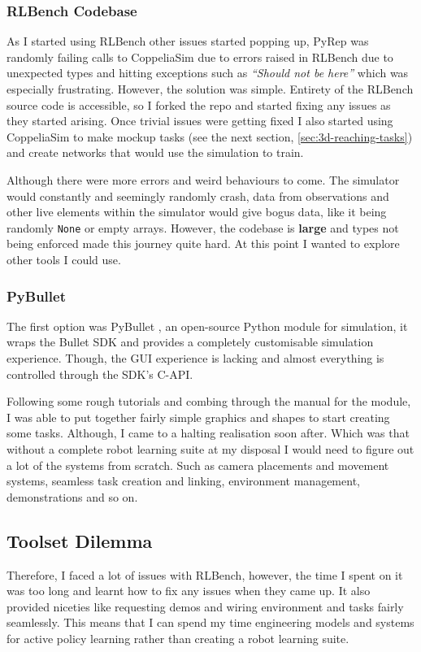 \subsubsection{RLBench Codebase}
As I started using RLBench other issues started popping up, PyRep was randomly failing calls to CoppeliaSim due to errors raised in RLBench due to unexpected types and hitting exceptions such as \emph{``Should not be here''} which was especially frustrating. However, the solution was simple. Entirety of the RLBench source code is accessible, so I forked the repo and started fixing any issues as they started arising. Once trivial issues were getting fixed I also started using CoppeliaSim to make mockup tasks (see the next section, \ref{sec:3d-reaching-tasks}) and create networks that would use the simulation to train.

Although there were more errors and weird behaviours to come. The simulator would constantly and seemingly randomly crash, data from observations and other live elements within the simulator would give bogus data, like it being randomly \verb|None| or empty arrays. However, the codebase is \textbf{large} and types not being enforced made this journey quite hard. At this point I wanted to explore other tools I could use.

\subsubsection{PyBullet}
The first option was PyBullet \cite{pybullet}, an open-source Python module for simulation, it wraps the Bullet SDK \cite{bullet3} and provides a completely customisable simulation experience. Though, the GUI experience is lacking and almost everything is controlled through the SDK's C-API.

Following some rough tutorials and combing through the manual for the module, I was able to put together fairly simple graphics and shapes to start creating some tasks. Although, I came to a halting realisation soon after. Which was that without a complete robot learning suite at my disposal I would need to figure out a lot of the systems from scratch. Such as camera placements and movement systems, seamless task creation and linking, environment management, demonstrations and so on.


\subsection{Toolset Dilemma}
Therefore, I faced a lot of issues with RLBench, however, the time I spent on it was too long and learnt how to fix any issues when they came up. It also provided niceties like requesting demos and wiring environment and tasks fairly seamlessly. This means that I can spend my time engineering models and systems for active policy learning rather than creating a robot learning suite.

